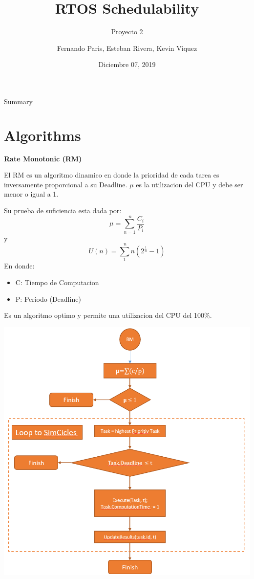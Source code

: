 \documentclass[aspectratio=43, xcolor=table]{beamer}
\title{RTOS Schedulability}
\subtitle{Proyecto 2}
\author[F. Paris, E. Rivera, K. Viquez]{Fernando Paris, Esteban Rivera, Kevin Viquez}
\institute[ITCR]{
    Maestria en Sistemas Empotrados%
    \\%
    Instituto Tenologico de Costa Rica%
}\date{Diciembre 07, 2019}
\begin{document}
\frame{\titlepage}

\begin{frame}{Summary}
\tableofcontents
\end{frame}

\section{Algorithms}

\frame{\sectionpage}

\twocolumn
\begin{normal}
\textbf{Rate Monotonic (RM)}
\vspace{4mm}
\end{normal}

\begin{footnotesize}
El RM es un algoritmo dinamico en donde la prioridad de cada tarea  es inversamente proporcional a su Deadline.  $\mu$ es la utilizacion del CPU y debe ser menor o igual a 1. 

\vspace{4mm}
Su prueba de suficiencia esta dada por:
\[ \mu = \sum_{n=1}^{\ n} \frac{C_{i}}{P_{i}} \] y \[  U(n) = \sum_{1}^{\ n} n(2^{\frac{1}{n}} - 1) \]
En donde:
\begin{itemize}
\item C: Tiempo de Computacion
\item P: Periodo (Deadline)
\end{itemize}
Es un algoritmo optimo y permite una utilizacion del CPU del 100\%.

\begin{center}
\includegraphics[scale=0.2]{RM}
\end{center}
\onecolumn
\end{footnotesize}
\end{document}
